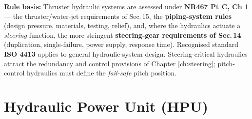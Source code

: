 \documentclass[11pt,a4paper]{report}
\begin{document}
\noindent\textbf{Rule basis:} Thruster hydraulic systems are assessed under
\textbf{NR467 Pt C, Ch 1} --- the thruster/water-jet requirements of Sec.\,15,
the \textbf{piping-system rules} (design pressure, materials, testing, relief),
and, where the hydraulics actuate a \emph{steering} function, the more stringent
\textbf{steering-gear requirements of Sec.\,14} (duplication, single-failure,
power supply, response time). Recognised standard \textbf{ISO 4413} applies to
general hydraulic-system design. Steering-critical hydraulics attract the
redundancy and control provisions of Chapter \ref{ch:steering}; pitch-control
hydraulics must define the \emph{fail-safe} pitch position.

\section{Hydraulic Power Unit (HPU)}
\end{document}

